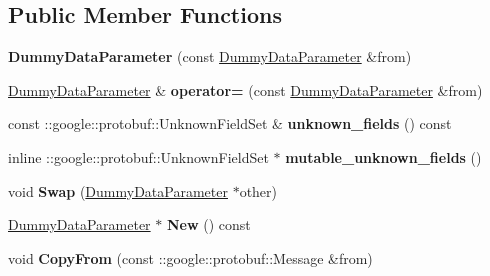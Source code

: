 \subsection*{Public Member Functions}
\begin{DoxyCompactItemize}
\item 
\mbox{\label{classcaffe_1_1_dummy_data_parameter_a2be424eda74d16c5018f4fe78a262e30}} 
{\bfseries Dummy\+Data\+Parameter} (const \mbox{\hyperlink{classcaffe_1_1_dummy_data_parameter}{Dummy\+Data\+Parameter}} \&from)
\item 
\mbox{\label{classcaffe_1_1_dummy_data_parameter_af3d429adc36816f3f61169c0aa925c2b}} 
\mbox{\hyperlink{classcaffe_1_1_dummy_data_parameter}{Dummy\+Data\+Parameter}} \& {\bfseries operator=} (const \mbox{\hyperlink{classcaffe_1_1_dummy_data_parameter}{Dummy\+Data\+Parameter}} \&from)
\item 
\mbox{\label{classcaffe_1_1_dummy_data_parameter_a7e45549811603a7ab345398353a0370a}} 
const \+::google\+::protobuf\+::\+Unknown\+Field\+Set \& {\bfseries unknown\+\_\+fields} () const
\item 
\mbox{\label{classcaffe_1_1_dummy_data_parameter_accacb957303140579464433aa5007498}} 
inline \+::google\+::protobuf\+::\+Unknown\+Field\+Set $\ast$ {\bfseries mutable\+\_\+unknown\+\_\+fields} ()
\item 
\mbox{\label{classcaffe_1_1_dummy_data_parameter_a2005d03860bbf052330512370b0fb544}} 
void {\bfseries Swap} (\mbox{\hyperlink{classcaffe_1_1_dummy_data_parameter}{Dummy\+Data\+Parameter}} $\ast$other)
\item 
\mbox{\label{classcaffe_1_1_dummy_data_parameter_a718ee3a36db7bfe204830ce8a151b9ef}} 
\mbox{\hyperlink{classcaffe_1_1_dummy_data_parameter}{Dummy\+Data\+Parameter}} $\ast$ {\bfseries New} () const
\item 
\mbox{\label{classcaffe_1_1_dummy_data_parameter_a36b883d0fe094d421683da6fcc48a9da}} 
void {\bfseries Copy\+From} (const \+::google\+::protobuf\+::\+Message \&from)

\end{DoxyCompactItemize}

